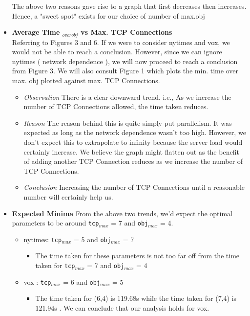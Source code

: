 \documentclass[12pt]{article}
\begin{document}
\begin{itemize}
The above two reasons gave rise to a graph that first decreases then increases. Hence, a "sweet spot" exists for our choice of number of max.obj
\item \textbf{Average Time $_{over obj}$ vs Max. TCP Connections}\\
Referring to Figures 3 and 6. If we were to consider nytimes and vox, we would not be able to reach a conclusion. However, since we can ignore nytimes ( network dependence ), we will now proceed to reach a conclusion from Figure 3. We will also consult Figure 1 which plots the min. time over max. obj plotted against max. TCP Connections.
\begin{itemize}
\item \textit{Observation} There is a clear downward trend. i.e., As we increase the number of TCP Connections allowed, the time taken reduces.
\item \textit{Reason} The reason behind this is quite simply put parallelism. It was expected as long as the network dependence wasn't too high. However, we don't expect this to extrapolate to infinity because the server load would certainly increase. We believe the graph might flatten out as the benefit of adding another TCP Connection reduces as we increase the number of TCP Connections.
\item \textit{Conclusion} Increasing the number of TCP Connections until a reasonable number will certainly help us.
\end{itemize}
\item \textbf{Expected Minima} From the above two trends, we'd expect the optimal parameters to be around \texttt{tcp}$_{max}$ = 7 and \texttt{obj}$_{max}$ = 4.
\begin{itemize}
\item nytimes: \texttt{tcp}$_{max}$ = 5 and \texttt{obj}$_{max}$ = 7
\\ \begin{itemize}
\item The time taken for these parameters is not too far off from the time taken for \texttt{tcp}$_{max}$ = 7 and \texttt{obj}$_{max}$ = 4
\end{itemize}
\item vox : \texttt{tcp}$_{max}$ = 6 and \texttt{obj}$_{max}$ = 5
\\ \begin{itemize}
\item The time taken for (6,4) is 119.68s while the time taken for (7,4) is 121.94s . We can conclude that our analysis holds for vox.
\end{itemize}
\end{itemize}

\end{itemize}
\end{document}
